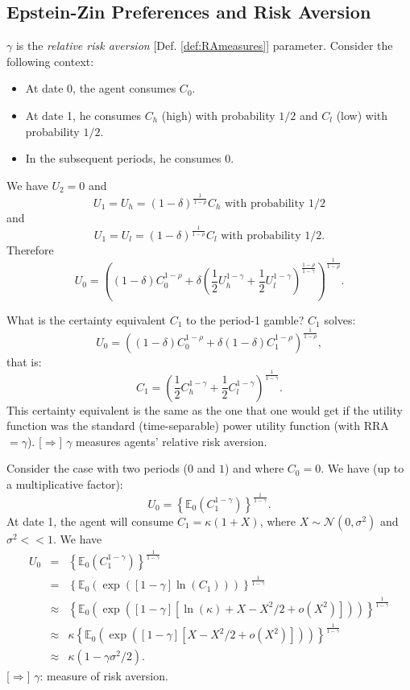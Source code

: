 \documentclass[
  12pt,
]{book}
\providecommand{\tightlist}{%
  \setlength{\itemsep}{0pt}\setlength{\parskip}{0pt}}
\theoremstyle{definition}
\theoremstyle{definition}
\theoremstyle{definition}
\theoremstyle{definition}
\theoremstyle{remark}
\begin{document}
\hypertarget{epstein-zin-preferences-and-risk-aversion}{%
\subsection{Epstein-Zin Preferences and Risk Aversion}\label{epstein-zin-preferences-and-risk-aversion}}

\(\gamma\) is the \emph{relative risk aversion} {[}Def. \ref{def:RAmeasures}{]} parameter.
Consider the following context:

\begin{itemize}
\tightlist
\item
  At date 0, the agent consumes \(C_0\).
\item
  At date 1, he consumes \(C_h\) (high) with probability \(1/2\) and \(C_l\) (low) with probability \(1/2\).
\item
  In the subsequent periods, he consumes 0.
\end{itemize}

We have \(U_2 = 0\) and
\[
U_1 = U_h = (1-\delta)^{\frac{1}{1-\rho}}C_h \mbox{ with probability 1/2}
\]
and
\[
U_1 = U_l = (1-\delta)^{\frac{1}{1-\rho}}C_l \mbox{ with probability 1/2}.
\]
Therefore
\[
U_0 =  \left((1-\delta)C_0^{1-\rho} + \delta \left(\frac{1}{2}U_h^{1-\gamma}+\frac{1}{2}U_l^{1-\gamma}\right)^{\frac{1-\rho}{1-\gamma}}\right)^{\frac{1}{1-\rho}}.
\]

What is the certainty equivalent \(C_1\) to the period-1 gamble? \(C_1\) solves:
\[
U_0 = \left((1-\delta)C_0^{1-\rho} + \delta (1-\delta) C_1^{1-\rho}\right)^{\frac{1}{1-\rho}},
\]
that is:
\[
C_1 = \left(\frac{1}{2}C_h^{1-\gamma}+\frac{1}{2}C_l^{1-\gamma}\right)^{\frac{1}{1-\gamma}}.
\]
This certainty equivalent is the same as the one that one would get if the utility function was the standard (time-separable) power utility function (with RRA \(= \gamma\)).
{[}\(\Rightarrow\){]} \(\gamma\) measures agents' relative risk aversion.

Consider the case with two periods (\(0\) and \(1\)) and where \(C_0=0\). We have (up to a multiplicative factor):
\[
U_0 = \left\{\mathbb{E}_0(C_{1}^{1-\gamma})\right\}^{\frac{1}{1-\gamma}}.
\]
At date 1, the agent will consume \(C_1 = \kappa(1+X)\), where \(X \sim \mathcal{N}(0,\sigma^2)\) and \(\sigma^2<<1\). We have
\begin{eqnarray*}
U_0 &=& \left\{\mathbb{E}_0(C_{1}^{1-\gamma})\right\}^{\frac{1}{1-\gamma}}\\
&=& \left\{\mathbb{E}_0(\exp([1-\gamma]\ln(C_1)))\right\}^{\frac{1}{1-\gamma}}\\
&\approx& \left\{\mathbb{E}_0(\exp([1-\gamma][\ln(\kappa) + X - X^2/2 + o(X^2)]))\right\}^{\frac{1}{1-\gamma}}\\
&\approx& \kappa \left\{\mathbb{E}_0(\exp([1-\gamma][X-X^2/2 + o(X^2)]))\right\}^{\frac{1}{1-\gamma}}\\
&\approx& \kappa (1-\gamma\sigma^2/2).
\end{eqnarray*}
{[}\(\Rightarrow\){]} \(\gamma\): measure of risk aversion.
\end{document}
